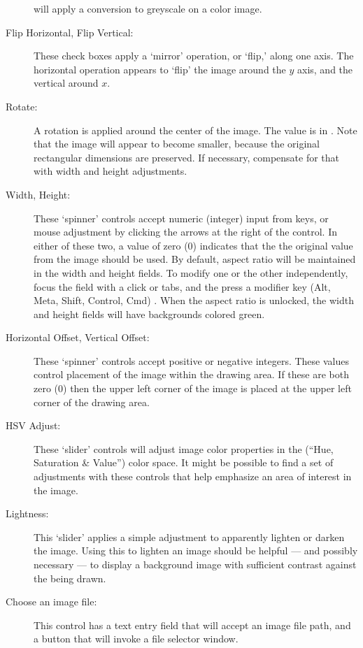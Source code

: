 \begin{description}
		  will apply a conversion to greyscale on a color
		  image.
		  \item[Flip Horizontal, Flip Vertical:] These check boxes
		  apply a `mirror' operation, or `flip,' along one
		  axis. The horizontal operation appears to `flip'
		  the image around the $y$ axis,
		  and the vertical around $x$.
		  \item[Rotate:] A rotation is applied around the
		  center of the image. The value is in .
		  Note that the image will appear to become smaller,
		  because the original rectangular dimensions
		  are preserved. If necessary, compensate for that
		  with width and height adjustments.
		  \item[Width, Height:] These `spinner' controls accept
		  numeric (integer) input from keys, or mouse adjustment
		  by clicking the arrows at the right of the control.
		  In either of these two, a value of zero (0)
		  indicates that the the original value from the image
		  should be used.
		  By default, aspect ratio will be maintained in the
		  width and height fields. To modify one or the other
		  independently, focus the field with a click or tabs,
		  and the press a modifier key (Alt, Meta, Shift,
		  Control, Cmd) . When the aspect ratio is unlocked,
		  the width and height fields will have
		  backgrounds colored green.
		  \item[Horizontal Offset, Vertical Offset:] These
		  `spinner' controls accept positive or negative
		  integers. These values control placement of the image
		  within the drawing area. If these are both
		  zero (0) then the upper left corner of the image
		  is placed at the upper left corner of the drawing
		  area.
		  \item[HSV Adjust:] These `slider' controls will
		  adjust image color properties in the
		  (``Hue, Saturation \& Value'') color space.
		  It might be possible to find a set of adjustments
		  with these controls that help emphasize an area
		  of interest in the image.
		  \item[Lightness:] This `slider' applies a simple
		  adjustment to apparently lighten or darken the
		  image. Using this to lighten an image should be
		  helpful --- and possibly necessary --- to display
		  a background image with sufficient contrast
		  against the  being drawn.
		  \item[Choose an image file:] This control has a
		  text entry field that will accept an image
		  file path, and a button that will invoke a
		  file selector  window.
		\end{description}

